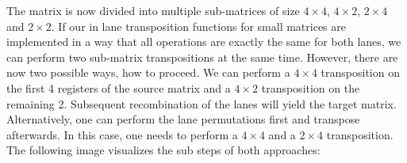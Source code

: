 \vspace{1cm}

The matrix is now divided into multiple sub-matrices of size $4\times 4$, $4\times 2$, $2\times 4$ and $2\times 2$.
If our in lane transposition functions for small matrices are implemented in a way that all operations are exactly the same for both lanes, we can perform two sub-matrix transpositions at the same time.
However, there are now two possible ways, how to proceed.
We can perform a $4 \times 4$ transposition on the first 4 registers of the source matrix and a $4 \times 2$ transposition on the remaining 2.
Subsequent recombination of the lanes will yield the target matrix.
Alternatively, one can perform the lane permutations first and transpose afterwards.
In this case, one needs to perform a $4 \times 4$ and a $2 \times 4$ transposition.
The following image visualizes the sub steps of both approaches:

